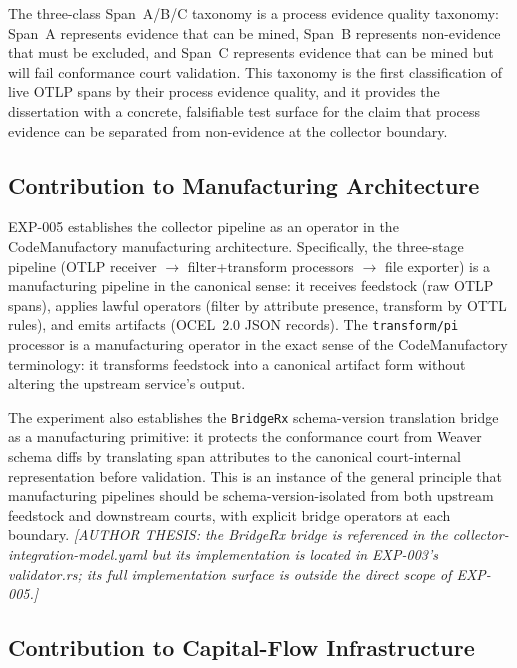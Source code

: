 The three-class Span~A/B/C taxonomy is a process evidence quality taxonomy: Span~A
represents evidence that can be mined, Span~B represents non-evidence that must be excluded,
and Span~C represents evidence that can be mined but will fail conformance court validation.
This taxonomy is the first classification of live OTLP spans by their process evidence quality,
and it provides the dissertation with a concrete, falsifiable test surface for the claim that
process evidence can be separated from non-evidence at the collector boundary.

\subsection{Contribution to Manufacturing Architecture}
\label{sec:otel-weaver-exp-005-collector-to-intake-contribution-manufacturing}

EXP-005 establishes the collector pipeline as an operator in the CodeManufactory manufacturing
architecture. Specifically, the three-stage pipeline (OTLP receiver $\to$ filter+transform
processors $\to$ file exporter) is a manufacturing pipeline in the canonical sense: it
receives feedstock (raw OTLP spans), applies lawful operators (filter by attribute presence,
transform by OTTL rules), and emits artifacts (OCEL~2.0 JSON records). The
\texttt{transform/pi} processor is a manufacturing operator in the exact sense of the
CodeManufactory terminology: it transforms feedstock into a canonical artifact form without
altering the upstream service's output.

The experiment also establishes the \texttt{BridgeRx} schema-version translation bridge as
a manufacturing primitive: it protects the conformance court from Weaver schema diffs by
translating span attributes to the canonical court-internal representation before validation.
This is an instance of the general principle that manufacturing pipelines should be
schema-version-isolated from both upstream feedstock and downstream courts, with explicit
bridge operators at each boundary. \textit{[AUTHOR THESIS: the BridgeRx bridge is referenced
in the collector-integration-model.yaml but its implementation is located in EXP-003's
validator.rs; its full implementation surface is outside the direct scope of EXP-005.]}

\subsection{Contribution to Capital-Flow Infrastructure}
\label{sec:otel-weaver-exp-005-collector-to-intake-contribution-capital-flow}

